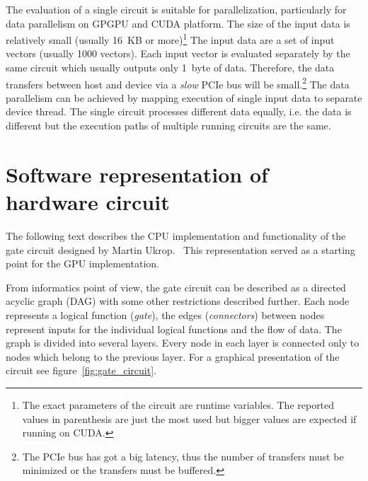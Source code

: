 \documentclass[12pt,twoside]{fithesis2}
\begin{document}
The evaluation of a single circuit is suitable for parallelization, particularly for data parallelism on GPGPU and CUDA platform. The size of the input data is relatively small (usually 16~KB or more)\footnote{The exact parameters of the circuit are runtime variables. The reported values in parenthesis are just the most used but bigger values are expected if running on CUDA.} The input data are a set of input vectors (usually 1000 vectors). Each input vector is evaluated separately by the same circuit which usually outputs only 1~byte of data. Therefore, the data transfers between host and device via a \emph{slow} PCIe bus will be small.\footnote{The PCIe bus has got a big latency, thus the number of transfers must be minimized or the transfers must be buffered.} The data parallelism can be achieved by mapping execution of single input data to separate device thread. The single circuit processes different data equally, i.e. the data is different but the execution paths of multiple running circuits are the same.


\section{Software representation of hardware circuit}

The following text describes the CPU implementation and functionality of the gate circuit designed by Martin Ukrop.~\cite{ukrop_thesis} This representation served as a starting point for the GPU implementation.

From informatics point of view, the gate circuit can be described as a directed acyclic graph (DAG) with some other restrictions described further. Each node represents a logical function (\emph{gate}), the edges (\emph{connectors}) between nodes represent inputs for the individual logical functions and the flow of data. The graph is divided into several layers. Every node in each layer is connected only to nodes which belong to the previous layer. For a graphical presentation of the circuit see figure~\ref{fig:gate_circuit}.~\cite{eacirc_circuit}
\end{document}
